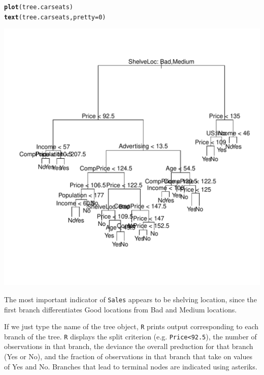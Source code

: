 \documentclass[12pt]{article}\usepackage[]{graphicx}\usepackage[]{color}
\makeatletter
\def\maxwidth{ %
  \ifdim\Gin@nat@width>\linewidth
    \linewidth
  \else
    \Gin@nat@width
  \fi
}
\newcommand{\hlnum}[1]{\textcolor[rgb]{0.686,0.059,0.569}{#1}}%
\newcommand{\hlstd}[1]{\textcolor[rgb]{0.345,0.345,0.345}{#1}}%
\newcommand{\hlkwc}[1]{\textcolor[rgb]{0.333,0.667,0.333}{#1}}%
\newcommand{\hlkwd}[1]{\textcolor[rgb]{0.737,0.353,0.396}{\textbf{#1}}}%
\newenvironment{kframe}{%
 \def\at@end@of@kframe{}%
 \ifinner\ifhmode%
  \def\at@end@of@kframe{\end{minipage}}%
  \begin{minipage}{\columnwidth}%
 \fi\fi%
 \def\FrameCommand##1{\hskip\@totalleftmargin \hskip-\fboxsep
 \colorbox{shadecolor}{##1}\hskip-\fboxsep
     \hskip-\linewidth \hskip-\@totalleftmargin \hskip\columnwidth}%
 \MakeFramed {\advance\hsize-\width
   \@totalleftmargin\z@ \linewidth\hsize
   \@setminipage}}%
 {\par\unskip\endMakeFramed%
 \at@end@of@kframe}
\newenvironment{knitrout}{}{} %
\makeatother
\begin{document}
\begin{knitrout}
\color{fgcolor}\begin{kframe}
\begin{alltt}
\hlkwd{plot}\hlstd{(tree.carseats)}
\hlkwd{text}\hlstd{(tree.carseats,} \hlkwc{pretty} \hlstd{=} \hlnum{0}\hlstd{)}
\end{alltt}
\end{kframe}
\includegraphics[width=\maxwidth]{figure/unnamed-chunk-6-1} 

\end{knitrout}

The most important indicator of \texttt{Sales} appears to be shelving location, since the first branch differentiates Good locations from Bad and Medium locations.

If we just type the name of the tree object, \texttt{R} prints output corresponding to each branch of the tree. \texttt{R} displays the split criterion (e.g. \texttt{Price<92.5}), the number of observations in that branch, the deviance the overall preduction for that branch (Yes or No), and the fraction of observations in that branch that take on values of Yes and No. Branches that lead to terminal nodes are indicated using asteriks.
\end{document}
